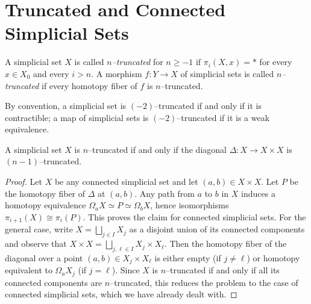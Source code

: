 \documentclass[main.tex]{subfiles}
\begin{document}
\section{Truncated and Connected Simplicial Sets}

\begin{definition}\label{defn:truncated_simp}
  A simplicial set \(X\) is called \emph{\(n\)--truncated} for \(n\geq-1\) if
  \(\pi_{i}(X,x) = *\) for every \(x\in X_{0}\) and every \(i>n\). A morphism
  \(f\colon Y\to X\) of simplicial sets is called \emph{\(n\)--truncated} if
  every homotopy fiber of \(f\) is \(n\)--truncated.

  By convention, a simplicial set is \((-2)\)--truncated if and only if it is
  contractible; a map of simplicial sets is \((-2)\)--truncated if it is a weak
  equivalence.
\end{definition}

\begin{lemma}\label{lem:truncated-diagonal}
  A simplicial set \(X\) is \(n\)--truncated if and only if the diagonal
  \(\Delta\colon X\to X\times X\) is \((n-1)\)--truncated.
\end{lemma}
\begin{proof}
  Let \(X\) be any connected simplicial set and let \((a,b)\in X\times X\). Let
  \(P\) be the homotopy fiber of \(\Delta\) at \((a,b)\). Any path from \(a\) to
  \(b\) in \(X\) induces a homotopy equivalence \(\Omega_{a}X \simeq P \simeq
  \Omega_{b} X\), hence isomorphisms \(\pi_{i+1}(X)\cong \pi_{i}(P)\). This
  proves the claim for connected simplicial sets. For the general case, write
  \(X = \bigsqcup_{j\in I} X_{j}\) as a disjoint union of its connected
  components and observe that \(X\times X = \bigsqcup_{j,\ell\in I} X_{j}\times
  X_{\ell}\). Then the homotopy fiber of the diagonal over a point \((a,b)\in
  X_{j}\times X_{\ell}\) is either empty (if \(j\neq \ell\)) or homotopy
  equivalent to \(\Omega_{a}X_{j}\) (if \(j = \ell\)). Since \(X\) is
  \(n\)--truncated if and only if all its connected components are
  \(n\)--truncated, this reduces the problem to the case of connected simplicial
  sets, which we have already dealt with.
\end{proof}
\end{document}
